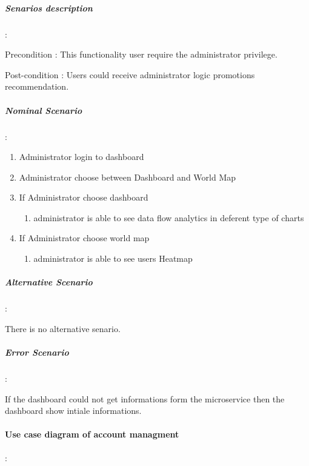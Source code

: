 \subparagraph{Senarios description} :
\label{sec:sec01}

Precondition : This functionality user require the administrator privilege.

Post-condition : Users could receive administrator logic promotions recommendation.

\subparagraph{Nominal Scenario} :
\label{sec:sec01}

 \begin{enumerate}
   \item Administrator login to dashboard
   \item Administrator choose between Dashboard and World Map
   \item If Administrator choose dashboard 
   \begin{enumerate}
     \item administrator is able to see data flow analytics in deferent type of charts
   \end{enumerate}
   \item If Administrator choose world map 
   \begin{enumerate}
     \item administrator is able to see users Heatmap
   \end{enumerate}
 \end{enumerate}

\subparagraph{Alternative Scenario} :
\label{sec:sec01}

There is no alternative senario.
\subparagraph{Error Scenario} :
\label{sec:sec01}

If the dashboard could not get informations form the microservice then the dashboard show intiale informations.
\paragraph{Use case diagram of account managment} :
\label{sec:sec01}

